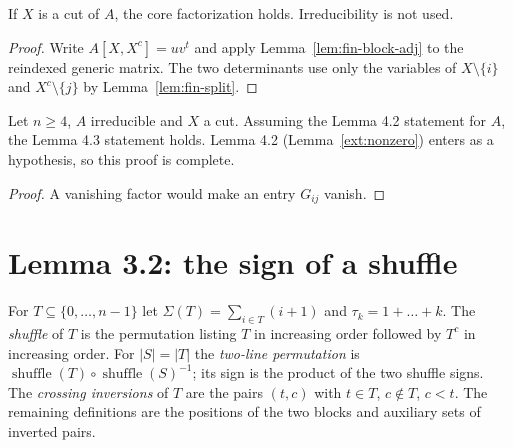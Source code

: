 \begin{theorem}
\label{thm:fin-core}
\leanok
{}
If $X$ is a cut of $A$, the core factorization holds. Irreducibility is not used.
\end{theorem}
\begin{proof}
\leanok
Write $A[X,X^c]=uv^t$ and apply Lemma~\ref{lem:fin-block-adj} to the reindexed generic
matrix. The two determinants use only the variables of $X\setminus\{i\}$ and
$X^c\setminus\{j\}$ by Lemma~\ref{lem:fin-split}.
\end{proof}

\begin{theorem}
\label{thm:fin-43}
\leanok
{}
Let $n\ge4$, $A$ irreducible and $X$ a cut. Assuming the Lemma 4.2 statement for $A$,
the Lemma 4.3 statement holds. Lemma 4.2 (Lemma~\ref{ext:nonzero}) enters as a
hypothesis, so this proof is complete.
\end{theorem}
\begin{proof}
\leanok
A vanishing factor would make an entry $G_{ij}$ vanish.
\end{proof}

\section{Lemma 3.2: the sign of a shuffle}

\begin{definition}
\label{def:fin-shuffle}
\leanok
For $T\subseteq\{0,\dots,n-1\}$ let $\Sigma(T)=\sum_{i\in T}(i+1)$ and
$\tau_k=1+\dots+k$. The \emph{shuffle} of $T$ is the permutation listing $T$ in increasing
order followed by $T^c$ in increasing order. For $|S|=|T|$ the \emph{two-line permutation}
is $\operatorname{shuffle}(T)\circ\operatorname{shuffle}(S)^{-1}$; its sign is the product
of the two shuffle signs. The \emph{crossing inversions} of $T$ are the pairs $(t,c)$ with
$t\in T$, $c\notin T$, $c<t$. The remaining definitions are the positions of the two
blocks and auxiliary sets of inverted pairs.
\end{definition}

